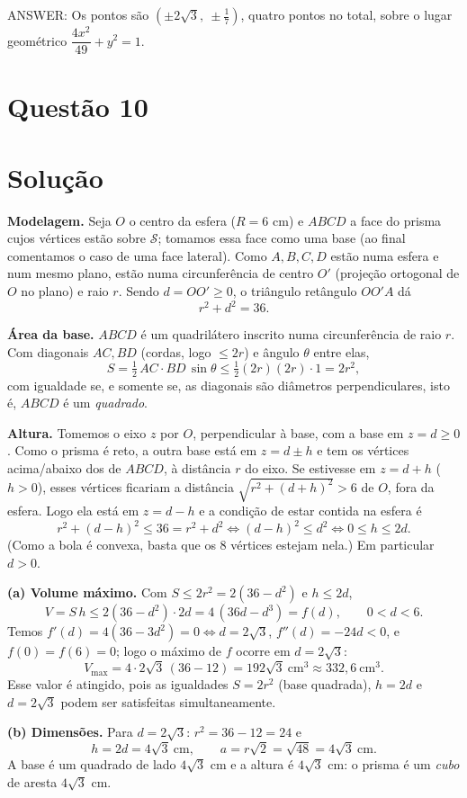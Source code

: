 \documentclass{article}%
\begin{document}
ANSWER: Os pontos são $\left(\pm 2\sqrt3,\ \pm \tfrac{1}{7}\right)$, quatro pontos no total, sobre o lugar geométrico $\dfrac{4x^2}{49}+y^2=1$.%
\newpage%
\section*{Questão 10}

\section*{Solução}

\textbf{Modelagem.} Seja $O$ o centro da esfera ($R=6$ cm) e $ABCD$ a face do prisma cujos vértices estão sobre $\mathcal S$; tomamos essa face como uma base (ao final comentamos o caso de uma face lateral). Como $A,B,C,D$ estão numa esfera e num mesmo plano, estão numa circunferência de centro $O'$ (projeção ortogonal de $O$ no plano) e raio $r$. Sendo $d=OO'\ge 0$, o triângulo retângulo $OO'A$ dá
\[
r^2+d^2=36 .
\]

\textbf{Área da base.} $ABCD$ é um quadrilátero inscrito numa circunferência de raio $r$. Com diagonais $AC,BD$ (cordas, logo $\le 2r$) e ângulo $\theta$ entre elas,
\[
S=\tfrac12\,AC\cdot BD\,\sin\theta\le \tfrac12(2r)(2r)\cdot 1=2r^2 ,
\]
com igualdade se, e somente se, as diagonais são diâmetros perpendiculares, isto é, $ABCD$ é um \emph{quadrado}.

\textbf{Altura.} Tomemos o eixo $z$ por $O$, perpendicular à base, com a base em $z=d\ge0$. Como o prisma é reto, a outra base está em $z=d\pm h$ e tem os vértices acima/abaixo dos de $ABCD$, à distância $r$ do eixo. Se estivesse em $z=d+h$ ($h>0$), esses vértices ficariam a distância $\sqrt{r^2+(d+h)^2}>6$ de $O$, fora da esfera. Logo ela está em $z=d-h$ e a condição de estar contida na esfera é
\[
r^2+(d-h)^2\le 36=r^2+d^2\iff (d-h)^2\le d^2\iff 0\le h\le 2d .
\]
(Como a bola é convexa, basta que os 8 vértices estejam nela.) Em particular $d>0$.

\textbf{(a) Volume máximo.} Com $S\le 2r^2=2(36-d^2)$ e $h\le 2d$,
\[
V=S\,h\le 2(36-d^2)\cdot 2d=4\,(36d-d^3)=f(d),\qquad 0<d<6 .
\]
Temos $f'(d)=4(36-3d^2)=0\iff d=2\sqrt3$, $f''(d)=-24d<0$, e $f(0)=f(6)=0$; logo o máximo de $f$ ocorre em $d=2\sqrt3$:
\[
V_{\max}=4\cdot 2\sqrt3\,(36-12)=192\sqrt3\ \text{cm}^3\approx 332{,}6\ \text{cm}^3 .
\]
Esse valor é atingido, pois as igualdades $S=2r^2$ (base quadrada), $h=2d$ e $d=2\sqrt3$ podem ser satisfeitas simultaneamente.

\textbf{(b) Dimensões.} Para $d=2\sqrt3$: $r^2=36-12=24$ e
\[
h=2d=4\sqrt3\ \text{cm},\qquad a=r\sqrt2=\sqrt{48}=4\sqrt3\ \text{cm}.
\]
A base é um quadrado de lado $4\sqrt3$ cm e a altura é $4\sqrt3$ cm: o prisma é um \emph{cubo} de aresta $4\sqrt3$ cm.
\end{document}
